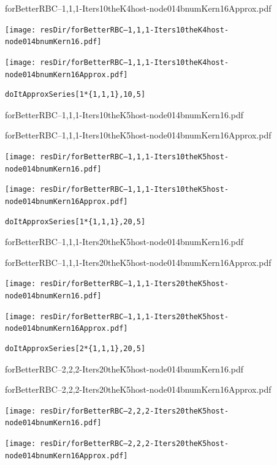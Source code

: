 \documentclass[12pt]{article}
\begin{document}
forBetterRBC--1,1,1-Iters10theK4host-node014bnumKern16Approx.pdf


\ifmacosx
  \fi
\iflinux
  \texttt{[image: resDir/forBetterRBC--1,1,1-Iters10theK4host-node014bnumKern16.pdf]}

  \texttt{[image: resDir/forBetterRBC--1,1,1-Iters10theK4host-node014bnumKern16Approx.pdf]}
\fi




\newpage

\begin{verbatim}
doItApproxSeries[1*{1,1,1},10,5]
\end{verbatim}

forBetterRBC--1,1,1-Iters10theK5host-node014bnumKern16.pdf


forBetterRBC--1,1,1-Iters10theK5host-node014bnumKern16Approx.pdf


\ifmacosx
  \fi
\iflinux
  \texttt{[image: resDir/forBetterRBC--1,1,1-Iters10theK5host-node014bnumKern16.pdf]}

  \texttt{[image: resDir/forBetterRBC--1,1,1-Iters10theK5host-node014bnumKern16Approx.pdf]}
\fi



\newpage

\begin{verbatim}
doItApproxSeries[1*{1,1,1},20,5]
\end{verbatim}

forBetterRBC--1,1,1-Iters20theK5host-node014bnumKern16.pdf


forBetterRBC--1,1,1-Iters20theK5host-node014bnumKern16Approx.pdf


\ifmacosx
  \fi
\iflinux
  \texttt{[image: resDir/forBetterRBC--1,1,1-Iters20theK5host-node014bnumKern16.pdf]}

  \texttt{[image: resDir/forBetterRBC--1,1,1-Iters20theK5host-node014bnumKern16Approx.pdf]}
\fi



\newpage

\begin{verbatim}
doItApproxSeries[2*{1,1,1},20,5]
\end{verbatim}

forBetterRBC--2,2,2-Iters20theK5host-node014bnumKern16.pdf


forBetterRBC--2,2,2-Iters20theK5host-node014bnumKern16Approx.pdf


\ifmacosx
  \fi
\iflinux
  \texttt{[image: resDir/forBetterRBC--2,2,2-Iters20theK5host-node014bnumKern16.pdf]}

  \texttt{[image: resDir/forBetterRBC--2,2,2-Iters20theK5host-node014bnumKern16Approx.pdf]}
\fi
\end{document}
